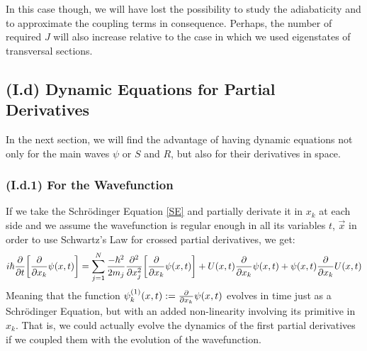 \documentclass[11pt, a4paper]{article} %
\begin{document}
In this case though, we will have lost the possibility to study the adiabaticity and to approximate the coupling terms in consequence. Perhaps, the number of required $J$ will also increase relative to the case in which we used eigenstates of transversal sections.



\subsection*{(I.d) Dynamic Equations for Partial Derivatives}
In the next section, we will find the advantage of having dynamic equations not only for the main waves $\psi$ or $S$ and $R$, but also for their derivatives in space.

\subsubsection*{(I.d.1) For the Wavefunction}
If we take the Schrödinger Equation \eqref{SE} and partially derivate it in $x_k$ at each side and we assume the wavefunction is regular enough in all its variables $t$, $\vec{x}$ in order to use Schwartz's Law for crossed partial derivatives, we get:
\begin{equation}
i\hbar \pdv{}{t}\qty[\pdv{}{x_k}\psi(x,t)] = \sum_{j=1}^N\frac{-\hbar^2}{2m_j}\pdv[2]{}{x_j}\qty[\pdv{}{x_k}\psi(x,t)]+U(x,t)\pdv{}{x_k}\psi(x,t) + \psi(x,t)\pdv{}{x_k}U(x,t)
\end{equation}
Meaning that the function $\psi^{(1)}_k(x,t):=\pdv{}{x_k}\psi(x,t)$ evolves in time just as a Schrödinger Equation, but with an added non-linearity involving its primitive in $x_k$. That is, we could actually evolve the dynamics of the first partial derivatives if we coupled them with the evolution of the wavefunction.
\end{document}
